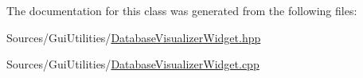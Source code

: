 The documentation for this class was generated from the following files\+:\begin{DoxyCompactItemize}
\item 
Sources/\+Gui\+Utilities/\hyperlink{_database_visualizer_widget_8hpp}{Database\+Visualizer\+Widget.\+hpp}\item 
Sources/\+Gui\+Utilities/\hyperlink{_database_visualizer_widget_8cpp}{Database\+Visualizer\+Widget.\+cpp}\end{DoxyCompactItemize}
